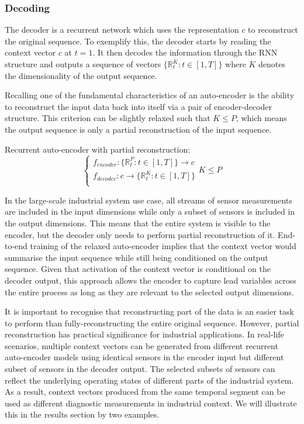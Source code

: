 \documentclass[runningheads]{llncs}
\begin{document}
\subsubsection{Decoding}
The decoder is a recurrent network which uses the representation \(c\) to reconstruct the original sequence. To exemplify this, the decoder starts by reading the context vector \(c\) at \(t=1\). It then decodes the information through the RNN structure and outputs a sequence of vectors \( \{ \mathbb{R}_t^K:t\in [1,T] \} \) where \(K\) denotes the dimensionality of the output sequence. 

Recalling one of the fundamental characteristics of an auto-encoder is the ability to reconstruct the input data back into itself via a pair of encoder-decoder structure. This criterion can be slightly relaxed such that \(K \leqslant P\), which means the output sequence is only a partial reconstruction of the input sequence.

Recurrent auto-encoder with partial reconstruction:
\begin{equation}
\label{seq2seq_autoencoder_relax_encoder}
\begin{cases} 
f_{encoder} : \{ \mathbb{R}_t^P:t \in [1, T] \} \rightarrow c \\
f_{decoder} : c \rightarrow \{ \mathbb{R}_t^K:t \in [1, T] \} \\
\end{cases} K \leqslant P
\end{equation}

In the large-scale industrial system use case, all streams of sensor measurements are included in the input dimensions while only a subset of sensors is included in the output dimensions. This means that the entire system is visible to the encoder, but the decoder only needs to perform partial reconstruction of it. End-to-end training of the relaxed auto-encoder implies that the context vector would summarise the input sequence while still being conditioned on the output sequence. Given that activation of the context vector is conditional on the decoder output, this approach allows the encoder to capture lead variables across the entire process as long as they are relevant to the selected output dimensions. 

It is important to recognise that reconstructing part of the data is an easier task to perform than fully-reconstructing the entire original sequence. However, partial reconstruction has practical significance for industrial applications. In real-life scenarios, multiple context vectors can be generated from different recurrent auto-encoder models using identical sensors in the encoder input but different subset of sensors in the decoder output. The selected subsets of sensors can reflect the underlying operating states of different parts of the industrial system. As a result, context vectors produced from the same temporal segment can be used as different diagnostic measurements in industrial context. We will illustrate this in the results section by two examples.
\end{document}
